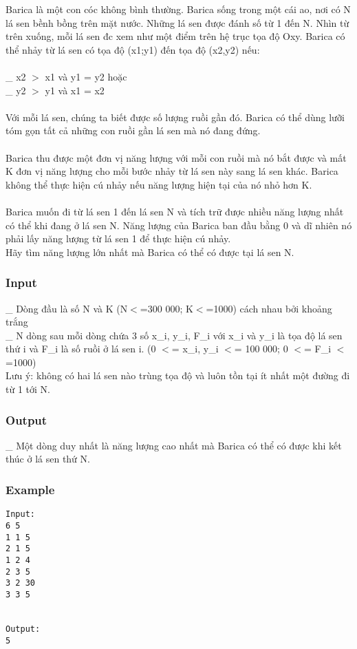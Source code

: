 



   Barica là một con cóc không bình thường. Barica sống trong một cái ao, nơi có N lá sen bềnh bồng trên mặt nước. Những lá sen được đánh số từ 1 đến N. Nhìn từ trên xuống, mỗi lá sen đc xem như một điểm trên hệ trục tọa độ Oxy. Barica có thể nhảy từ lá sen có tọa độ (x1;y1) đến tọa độ (x2,y2) nếu:   
\\
\\   \_ x2 $>$ x1 và y1 = y2 hoặc   
\\   \_ y2 $>$ y1 và x1 = x2   
\\
\\   Với mỗi  lá sen, chúng ta biết được số lượng ruồi gần đó. Barica có thể dùng lưỡi tóm gọn tất cả những con ruồi gần lá sen mà nó đang đứng.   
\\
\\   Barica thu được một đơn vị năng lượng với mỗi con ruồi mà nó bắt được và mất K đơn vị năng lượng cho mỗi bước nhảy từ lá sen này sang lá sen khác. Barica không thể thực hiện cú nhảy nếu năng lượng hiện tại của nó nhỏ hơn K.   
\\
\\   Barica muốn đi từ lá sen 1 đến lá sen N và tích trữ được nhiều năng lượng nhất có thể khi đang ở lá sen N. Năng lượng của Barica ban đầu bằng 0 và dĩ nhiên nó phải lấy năng lượng từ lá sen 1 để thực hiện cú nhảy.   
\\   Hãy tìm năng lượng lớn nhất mà Barica có thể có được tại lá sen N.  

\subsubsection{   Input  }

   \_ Dòng đầu là số N và K (N$<$=300 000; K$<$=1000) cách nhau bởi khoảng trắng   
\\   \_ N dòng sau mỗi dòng chứa 3 số x\_i, y\_i, F\_i với x\_i và y\_i là tọa độ lá sen thứ i và F\_i là số ruồi ở lá sen i.  (0 $<$= x\_i, y\_i $<$= 100 000; 0 $<$= F\_i $<$=1000)   
\\   Lưu ý: không có hai lá sen nào trùng tọa độ và luôn tồn tại ít nhất một đường đi từ 1 tới N.  

\subsubsection{   Output  }

   \_ Một dòng duy nhất là năng lượng cao nhất mà Barica có thể có được khi kết thúc ở lá sen thứ N.  

\subsubsection{   Example  }
\begin{verbatim}
Input:
6 5
1 1 5
2 1 5
1 2 4
2 3 5
3 2 30
3 3 5


Output:
5
\end{verbatim}